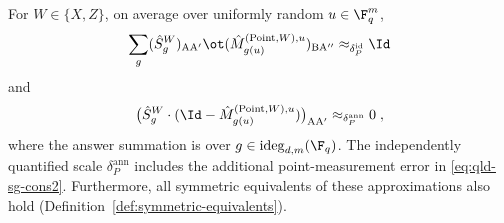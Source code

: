 \begin{lemma}\label{lem:qld-constructing-the-paulis-helper}
	\leanok
	For $W \in \{X,Z\}$, on average over uniformly random $u \in \F_q^m$,
	\begin{equation}\label{eq:qld-sg-cons}
		\sum_g (\hat{S}^W_g)_{\mathrm{A}\mathrm{A}'} \ot (\hat{M}^{(\mathrm{Point},W),u}_{g(u)})_{\mathrm{B}\mathrm{A}''} \approx_{\delta_P^{\mathrm{id}}} \Id
	\end{equation}
	and
	\begin{equation}\label{eq:qld-sg-cons2}
		\bigl(\hat{S}^W_g \cdot (\Id - \hat{M}^{(\mathrm{Point}, W), u}_{g(u)})\bigr)_{\mathrm{A}\mathrm{A}'} \approx_{\delta_P^{\mathrm{ann}}} 0\;,
	\end{equation}
	where the answer summation is over $g \in \mathrm{ideg}_{d,m}(\F_q)$. The independently quantified scale $\delta_P^{\mathrm{ann}}$ includes the additional point-measurement error in \eqref{eq:qld-sg-cons2}. Furthermore, all symmetric equivalents of these approximations also hold (Definition~\ref{def:symmetric-equivalents}).
\end{lemma}
